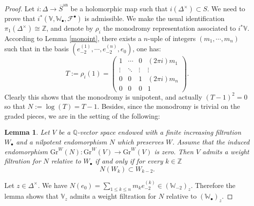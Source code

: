\documentclass[10pt]{article}
\numberwithin{equation}{subsection}
\theoremstyle{plain}
\newtheorem{lemma}[theorem]{Lemma}
\theoremstyle{definition}
\theoremstyle{remark}
\newcommand{\Z}{\mathbb Z}
\newcommand{\Q}{\mathbb Q}
\newcommand{\V}{\mathbb V}
\newcommand{\W}{\mathbb W}
\newcommand{\bul}{\bullet}
\newcommand{\an}{\mathrm{an}}
\newcommand{\Gr}{\mathrm{Gr}}
\begin{document}
\begin{proof}
Let $i : \Delta \rightarrow \overline{S}^\an$ be a holomorphic map such that $i(\Delta^\times) \subset S$. We need to prove that $i^\ast (\V, \W_\bul, \mathcal{F}^\bul)$ is admissible. We make the usual identification $\pi_1(\Delta^\times) \cong \Z$, and denote by $\rho_i$ the monodromy representation associated to $i ^\ast \V$. According to Lemma \ref{monoint}, there exists a $n$-uple of integers $(m_1,\cdots, m_n)$ such that in the basis $(e_{-2}^{(1)}, \cdots, e_{-2}^{(n)}, e_0)$, one has:
\[
T := \rho_i(1) =  \left(\begin{array}{cccc}1  &  \cdots & 0 & (2\pi i) m_1 \\ \vdots & \ddots & \vdots & \vdots \\0 & 0 & 1 & (2\pi i) m_n  \\0 & 0 & 0 & 1\end{array}\right).
\]
Clearly this shows that the monodromy is unipotent, and actually $(T-1)^2 = 0$ so that $N := \log(T) = T-1$. Besides, since the monodromy is trivial on the graded pieces, we are in the setting of the following:
\begin{lemma}
Let $V$ be a $\Q$-vector space endowed with a finite increasing filtration $W_\bul$ and a nilpotent endomorphism $N$ which preserves $W$. Assume that the induced endomorphism $\Gr^W(N) : \Gr^W(V) \rightarrow \Gr^W(V)$ is zero. Then $V$ admits a weight filtration for $N$ relative to $W_\bul$ if and only if for every $k \in \Z$
\[
N(W_k) \subset W_{k-2}.
\]
\end{lemma}
Let $z \in \Delta^\times$. We have $N(e_0) = \sum_{1 \leqslant k \leqslant n} m_k e_{-2}^{(k)} \in (\W_{-2})_z$. Therefore the lemma shows that $\V_z$ admits a weight filtration for $N$ relative to $(\W_\bul)_z$.


\end{proof}
\end{document}
